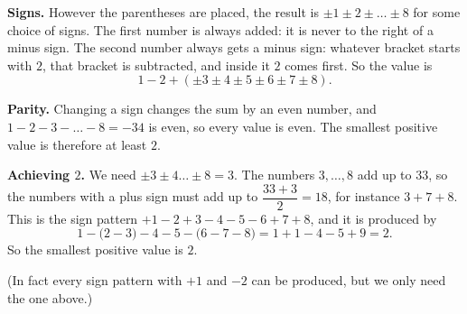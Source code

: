 \textbf{Signs.} However the parentheses are placed, the result is $\pm1\pm2\pm\dots\pm8$ for some choice of signs. The first number is always added: it is never to the right of a minus sign. The second number always gets a minus sign: whatever bracket starts with $2$, that bracket is subtracted, and inside it $2$ comes first. So the value is
\[
1-2+(\pm3\pm4\pm5\pm6\pm7\pm8).
\]

\textbf{Parity.} Changing a sign changes the sum by an even number, and $1-2-3-\dots-8=-34$ is even, so every value is even. The smallest positive value is therefore at least $2$.

\textbf{Achieving $2$.} We need $\pm3\pm4\dots\pm8=3$. The numbers $3,\dots,8$ add up to $33$, so the numbers with a plus sign must add up to $\dfrac{33+3}{2}=18$, for instance $3+7+8$. This is the sign pattern $+1-2+3-4-5-6+7+8$, and it is produced by
\[
1-\big(2-3\big)-4-5-\big(6-7-8\big)=1+1-4-5+9=2 .
\]
So the smallest positive value is $\boxed{2}$.

(In fact every sign pattern with $+1$ and $-2$ can be produced, but we only need the one above.)
